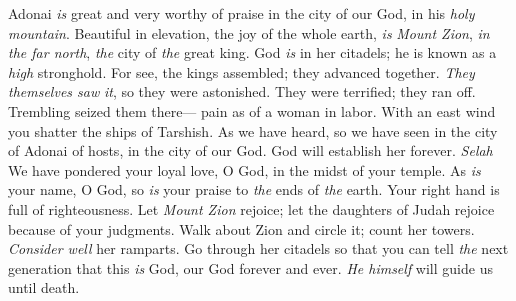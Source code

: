 \begin{biblechapter} %
 Adonai \textit{is} great and very worthy of praise 
in the city of our God, in his \textit{holy mountain}.
\verse Beautiful in elevation, the joy of the whole earth, 
\textit{is} \textit{Mount Zion}, \textit{in the far north}, 
\textit{the} city of \textit{the} great king.
\verse God \textit{is} in her citadels; 
he is known as a \textit{high} stronghold.
\verse For see, the kings assembled; 
they advanced together.
\verse \textit{They themselves saw} \textit{it}, so they were astonished. 
They were terrified; they ran off.
\verse Trembling seized them there— 
pain as of a woman in labor.
\verse With an east wind 
you shatter the ships of Tarshish.
\verse As we have heard, so we have seen 
in the city of Adonai of hosts, in the city of our God. 
God will establish her forever. \textit{Selah}
\verse We have pondered your loyal love, O God, 
in the midst of your temple.
\verse As \textit{is} your name, O God, so \textit{is} your praise 
to \textit{the} ends of \textit{the} earth. 
Your right hand is full of righteousness.
\verse Let \textit{Mount Zion} rejoice; 
let the daughters of Judah rejoice 
because of your judgments.
\verse Walk about Zion and circle it; 
count her towers.
\verse \textit{Consider well} her ramparts. 
Go through her citadels 
so that you can tell \textit{the} next generation
\verse that this \textit{is} God, our God forever and ever. 
\textit{He himself} will guide us until death.
\end{biblechapter}

